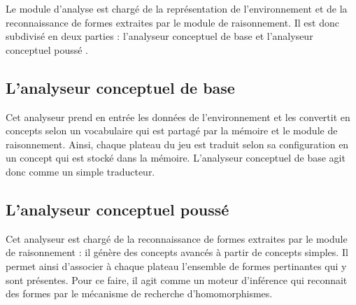 Le module d'analyse est chargé de la représentation de l'environnement et de la reconnaissance de formes extraites par le module de raisonnement. Il est donc subdivisé en deux parties : \og l'analyseur conceptuel de base \fg{} et \og l'analyseur conceptuel poussé \fg{}.
\subsection{L'analyseur conceptuel de base}\label{def:analyseur de base}
Cet analyseur prend en entrée les données de l'environnement et les convertit en concepts selon un vocabulaire qui est partagé par la mémoire et le module de raisonnement. Ainsi, chaque plateau du jeu est traduit selon sa configuration en un concept qui est stocké dans la mémoire. L'analyseur conceptuel de base agit donc comme un simple traducteur.
\subsection{L'analyseur conceptuel poussé}\label{def:analyseur pousse}
Cet analyseur est chargé de la reconnaissance de formes extraites par le module de raisonnement : il génère des concepts avancés à partir de concepts simples. Il permet ainsi d'associer à chaque plateau l'ensemble de formes pertinantes qui y sont présentes. Pour ce faire, il agit comme un moteur d'inférence qui reconnait des formes par le mécanisme de recherche d'homomorphismes.
